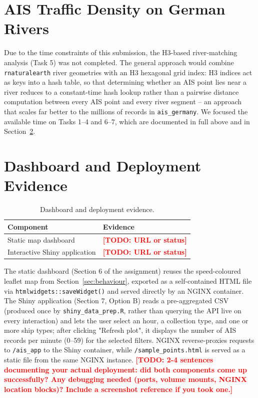 \documentclass[11pt,a4paper]{article}
\newcommand{\TODO}[1]{\textcolor{red}{\textbf{[TODO: #1]}}}
\begin{document}
\section{AIS Traffic Density on German Rivers}
\label{sec:rivers}

Due to the time constraints of this submission, the H3-based river-matching
analysis (Task 5) was not completed. The general approach would combine
\texttt{rnaturalearth} river geometries with an H3 hexagonal grid index: H3
indices act as keys into a hash table, so that determining whether an AIS point
lies near a river reduces to a constant-time hash lookup rather than a pairwise
distance computation between every AIS point and every river segment -- an
approach that scales far better to the millions of records in
\texttt{ais\_germany}. We focused the available time on Tasks 1--4 and 6--7,
which are documented in full above and in Section~\ref{sec:dashboard}.

\section{Dashboard and Deployment Evidence}
\label{sec:dashboard}

\begin{table}[h]
  \centering
  \caption{Dashboard and deployment evidence.}
  \label{tab:deployment}
  \begin{tabular}{ll}
    \toprule
    Component & Evidence \\
    \midrule
    Static map dashboard & %
    \TODO{URL or status} \\
    Interactive Shiny application & %
    \TODO{URL or status} \\
    \bottomrule
  \end{tabular}
\end{table}

The static dashboard (Section 6 of the assignment) reuses the speed-coloured
leaflet map from Section~\ref{sec:behaviour}, exported as a self-contained HTML
file via \texttt{htmlwidgets::saveWidget()} and served directly by an NGINX
container. The Shiny application (Section 7, Option B) reads a pre-aggregated
CSV (produced once by \texttt{shiny\_data\_prep.R}, rather than querying the API
live on every interaction) and lets the user select an hour, a collection type,
and one or more ship types; after clicking "Refresh plot", it displays the
number of AIS records per minute (0--59) for the selected filters. NGINX
reverse-proxies requests to \texttt{/ais\_app} to the Shiny container, while
\texttt{/sample\_points.html} is served as a static file from the same NGINX
instance.
\TODO{2-4 sentences documenting your actual deployment: did both components
come up successfully? Any debugging needed (ports, volume mounts, NGINX
location blocks)? Include a screenshot reference if you took one.}
\end{document}
